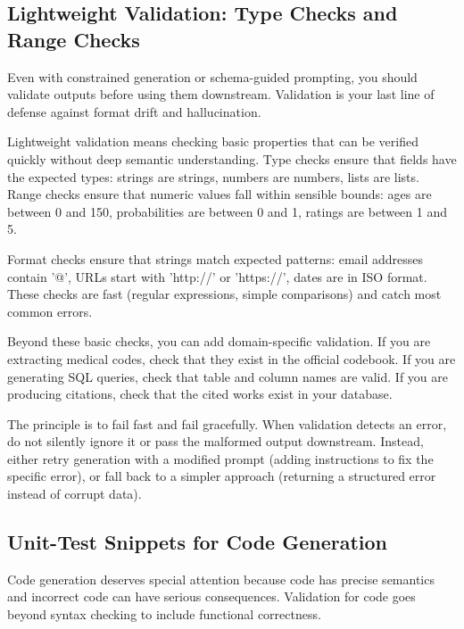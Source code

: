 \vspace{1.5em}

\subsection{Lightweight Validation: Type Checks and Range Checks}

Even with constrained generation or schema-guided prompting, you should validate outputs before using them downstream. Validation is your last line of defense against format drift and hallucination.

Lightweight validation means checking basic properties that can be verified quickly without deep semantic understanding. Type checks ensure that fields have the expected types: strings are strings, numbers are numbers, lists are lists. Range checks ensure that numeric values fall within sensible bounds: ages are between 0 and 150, probabilities are between 0 and 1, ratings are between 1 and 5.

Format checks ensure that strings match expected patterns: email addresses contain '@', URLs start with 'http://' or 'https://', dates are in ISO format. These checks are fast (regular expressions, simple comparisons) and catch most common errors.

Beyond these basic checks, you can add domain-specific validation. If you are extracting medical codes, check that they exist in the official codebook. If you are generating SQL queries, check that table and column names are valid. If you are producing citations, check that the cited works exist in your database.

The principle is to fail fast and fail gracefully. When validation detects an error, do not silently ignore it or pass the malformed output downstream. Instead, either retry generation with a modified prompt (adding instructions to fix the specific error), or fall back to a simpler approach (returning a structured error instead of corrupt data).

\vspace{1em}

\subsection{Unit-Test Snippets for Code Generation}

Code generation deserves special attention because code has precise semantics and incorrect code can have serious consequences. Validation for code goes beyond syntax checking to include functional correctness.

